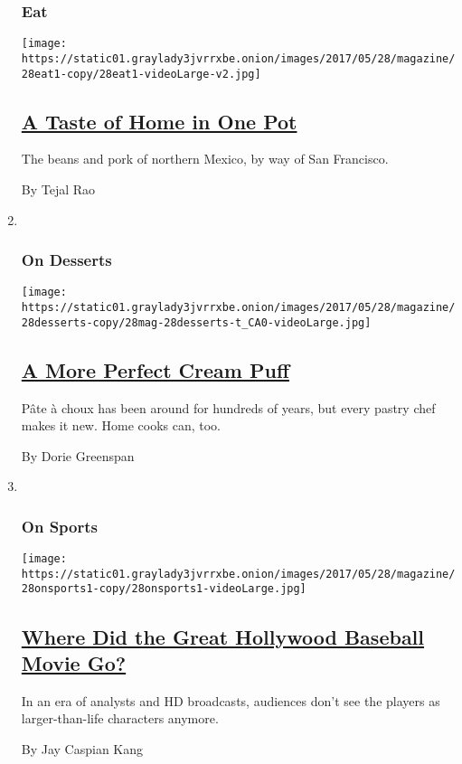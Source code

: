 \begin{enumerate}
{  \subsubsection{Eat}\label{eat}}

  \texttt{[image: https://static01.graylady3jvrrxbe.onion/images/2017/05/28/magazine/28eat1-copy/28eat1-videoLarge-v2.jpg]}

  \hypertarget{a-taste-of-home-in-one-pot}{%
  \subsection{\texorpdfstring{\href{/2017/05/25/magazine/a-taste-of-home-in-one-pot.html}{A
  Taste of Home in One
  Pot}}{A Taste of Home in One Pot}}\label{a-taste-of-home-in-one-pot}}

  The beans and pork of northern Mexico, by way of San Francisco.

  By Tejal Rao
\item ~
  \hypertarget{on-desserts}{%
  \subsubsection{On Desserts}\label{on-desserts}}

  \texttt{[image: https://static01.graylady3jvrrxbe.onion/images/2017/05/28/magazine/28desserts-copy/28mag-28desserts-t\_CA0-videoLarge.jpg]}

  \hypertarget{a-more-perfect-cream-puff}{%
  \subsection{\texorpdfstring{\href{/2017/05/26/magazine/a-more-perfect-cream-puff.html}{A
  More Perfect Cream
  Puff}}{A More Perfect Cream Puff}}\label{a-more-perfect-cream-puff}}

  Pâte à choux has been around for hundreds of years, but every pastry
  chef makes it new. Home cooks can, too.

  By Dorie Greenspan
\item ~
  \hypertarget{on-sports}{%
  \subsubsection{On Sports}\label{on-sports}}

  \texttt{[image: https://static01.graylady3jvrrxbe.onion/images/2017/05/28/magazine/28onsports1-copy/28onsports1-videoLarge.jpg]}

  \hypertarget{where-did-the-great-hollywood-baseball-movie-go}{%
  \subsection{\texorpdfstring{\href{/2017/05/23/magazine/where-did-the-great-hollywood-baseball-movie-go.html}{Where
  Did the Great Hollywood Baseball Movie
  Go?}}{Where Did the Great Hollywood Baseball Movie Go?}}\label{where-did-the-great-hollywood-baseball-movie-go}}

  In an era of analysts and HD broadcasts, audiences don't see the
  players as larger-than-life characters anymore.

  By Jay Caspian Kang
\end{enumerate}

